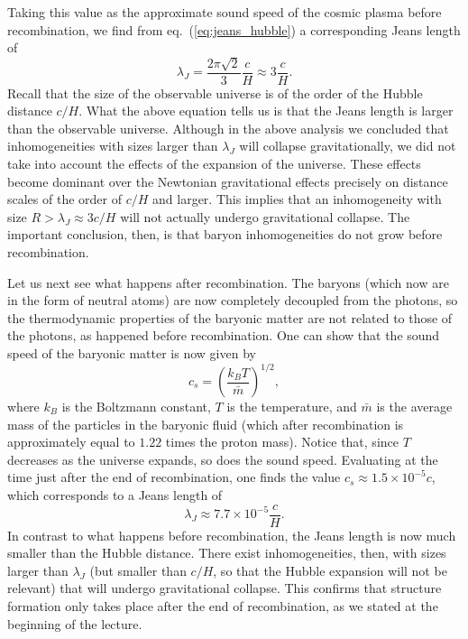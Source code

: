 Taking this value as the approximate sound speed of the cosmic plasma before recombination, we find from eq.\ (\ref{eq:jeans_hubble}) a corresponding Jeans length of
\begin{equation}
\lambda_J= \frac{2\pi\sqrt{2}}{3}\frac{c}{H}\approx 3\frac{c}{H}.
\end{equation}
Recall that the size of the observable universe is of the order of the Hubble distance $c/H$. What the above equation tells us is that the Jeans length is larger than the observable universe. Although in the above analysis we concluded that inhomogeneities with sizes larger than $\lambda_J$ will collapse gravitationally, we did not take into account the effects of the expansion of the universe. These effects become dominant over the Newtonian gravitational effects precisely on distance scales of the order of $c/H$ and larger. This implies that an inhomogeneity with size $R>\lambda_J\approx 3c/H$ will not actually undergo gravitational collapse. The important conclusion, then, is that baryon inhomogeneities do not grow before recombination.

Let us next see what happens after recombination. The baryons (which now are in the form of neutral atoms) are now completely decoupled from the photons, so the thermodynamic properties of the baryonic matter are not related to those of the photons, as happened before recombination. One can show that the sound speed of the baryonic matter is now given by
\begin{equation} \label{eq:sound_speed2}
c_s=\left(\frac{k_B T}{\bar{m}}\right)^{1/2},
\end{equation}
where $k_B$ is the Boltzmann constant, $T$ is the temperature, and $\bar{m}$ is the average mass of the particles in the baryonic fluid (which after recombination is approximately equal to $1.22$ times the proton mass). Notice that, since $T$ decreases as the universe expands, so does the sound speed. Evaluating at the time just after the end of recombination, one finds the value $c_s\approx1.5\times10^{-5}c$, which corresponds to a Jeans length of
\begin{equation}
\lambda_J\approx 7.7\times10^{-5}\frac{c}{H}.
\end{equation}
In contrast to what happens before recombination, the Jeans length is now much smaller than the Hubble distance. There exist inhomogeneities, then, with sizes larger than $\lambda_J$ (but smaller than $c/H$, so that the Hubble expansion will not be relevant) that will undergo gravitational collapse. This confirms that structure formation only takes place after the end of recombination, as we stated at the beginning of the lecture.

